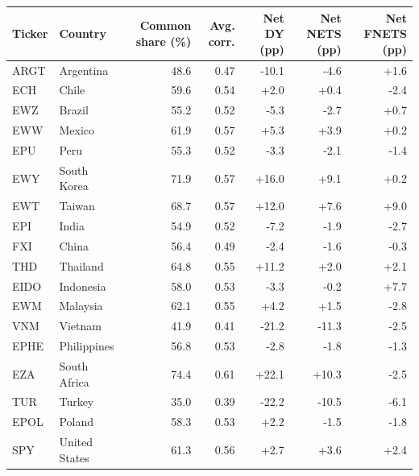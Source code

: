 \begin{tabular}{llrrrrr}
\toprule
Ticker & Country & Common share (\%) & Avg. corr. & Net DY (pp) & Net NETS (pp) & Net FNETS (pp) \\
\midrule
ARGT & Argentina & 48.6 & 0.47 & -10.1 & -4.6 & +1.6 \\
ECH & Chile & 59.6 & 0.54 & +2.0 & +0.4 & -2.4 \\
EWZ & Brazil & 55.2 & 0.52 & -5.3 & -2.7 & +0.7 \\
EWW & Mexico & 61.9 & 0.57 & +5.3 & +3.9 & +0.2 \\
EPU & Peru & 55.3 & 0.52 & -3.3 & -2.1 & -1.4 \\
EWY & South Korea & 71.9 & 0.57 & +16.0 & +9.1 & +0.2 \\
EWT & Taiwan & 68.7 & 0.57 & +12.0 & +7.6 & +9.0 \\
EPI & India & 54.9 & 0.52 & -7.2 & -1.9 & -2.7 \\
FXI & China & 56.4 & 0.49 & -2.4 & -1.6 & -0.3 \\
THD & Thailand & 64.8 & 0.55 & +11.2 & +2.0 & +2.1 \\
EIDO & Indonesia & 58.0 & 0.53 & -3.3 & -0.2 & +7.7 \\
EWM & Malaysia & 62.1 & 0.55 & +4.2 & +1.5 & -2.8 \\
VNM & Vietnam & 41.9 & 0.41 & -21.2 & -11.3 & -2.5 \\
EPHE & Philippines & 56.8 & 0.53 & -2.8 & -1.8 & -1.3 \\
EZA & South Africa & 74.4 & 0.61 & +22.1 & +10.3 & -2.5 \\
TUR & Turkey & 35.0 & 0.39 & -22.2 & -10.5 & -6.1 \\
EPOL & Poland & 58.3 & 0.53 & +2.2 & -1.5 & -1.8 \\
SPY & United States & 61.3 & 0.56 & +2.7 & +3.6 & +2.4 \\
\bottomrule
\end{tabular}

